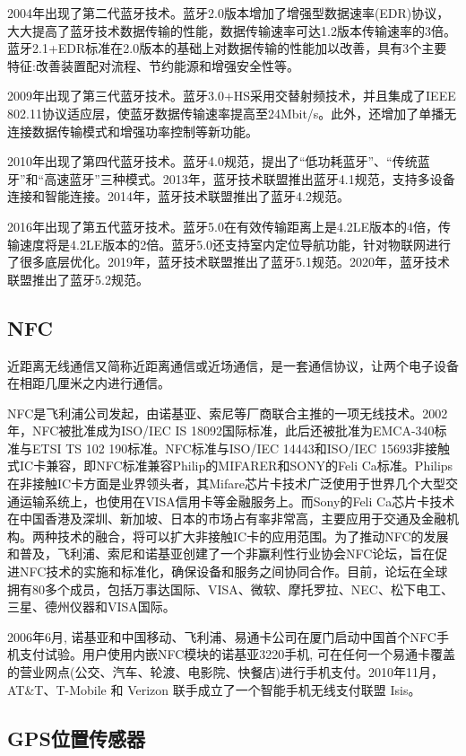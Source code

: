 \documentclass[lang=cn]{elegantpaper}
\begin{document}
2004年出现了第二代蓝牙技术。蓝牙2.0版本增加了增强型数据速率(EDR)协议，大大提高了蓝牙技术数据传输的性能，数据传输速率可达1.2版本传输速率的3倍。蓝牙2.1+EDR标准在2.0版本的基础上对数据传输的性能加以改善，具有3个主要特征:改善装置配对流程、节约能源和增强安全性等。

2009年出现了第三代蓝牙技术。蓝牙3.0+HS采用交替射频技术，并且集成了IEEE 802.11协议适应层，使蓝牙数据传输速率提高至24Mbit/s。此外，还增加了单播无连接数据传输模式和增强功率控制等新功能。

2010年出现了第四代蓝牙技术。蓝牙4.0规范，提出了“低功耗蓝牙”、“传统蓝牙”和“高速蓝牙”三种模式。2013年，蓝牙技术联盟推出蓝牙4.1规范，支持多设备连接和智能连接。2014年，蓝牙技术联盟推出了蓝牙4.2规范。\cite{BlueTooth}

2016年出现了第五代蓝牙技术。蓝牙5.0在有效传输距离上是4.2LE版本的4倍，传输速度将是4.2LE版本的2倍。蓝牙5.0还支持室内定位导航功能，针对物联网进行了很多底层优化。2019年，蓝牙技术联盟推出了蓝牙5.1规范。2020年，蓝牙技术联盟推出了蓝牙5.2规范。

\subsection{NFC}

近距离无线通信又简称近距离通信或近场通信，是一套通信协议，让两个电子设备在相距几厘米之内进行通信。

NFC是飞利浦公司发起，由诺基亚、索尼等厂商联合主推的一项无线技术。2002年，NFC被批准成为ISO/IEC IS 18092国际标准，此后还被批准为EMCA-340标准与ETSI TS 102 190标准。NFC标准与ISO/IEC 14443和ISO/IEC 15693非接触式IC卡兼容，即NFC标准兼容Philip的MIFARER和SONY的Feli Ca标准。Philips在非接触IC卡方面是业界领头者，其Mifare芯片卡技术广泛使用于世界几个大型交通运输系统上，也使用在VISA信用卡等金融服务上。而Sony的Feli Ca芯片卡技术在中国香港及深圳、新加坡、日本的市场占有率非常高，主要应用于交通及金融机构。两种技术的融合，将可以扩大非接触IC卡的应用范围。为了推动NFC的发展和普及，飞利浦、索尼和诺基亚创建了一个非赢利性行业协会NFC论坛，旨在促进NFC技术的实施和标准化，确保设备和服务之间协同合作。目前，论坛在全球拥有80多个成员，包括万事达国际、VISA、微软、摩托罗拉、NEC、松下电工、三星、德州仪器和VISA国际。\cite{BlueTooth2}

2006年6月, 诺基亚和中国移动、飞利浦、易通卡公司在厦门启动中国首个NFC手机支付试验。用户使用内嵌NFC模块的诺基亚3220手机, 可在任何一个易通卡覆盖的营业网点(公交、汽车、轮渡、电影院、快餐店)进行手机支付\cite{NFC}。2010年11月，AT\&T、T-Mobile 和 Verizon 联手成立了一个智能手机无线支付联盟 Isis。

\subsection{GPS位置传感器}
\end{document}
